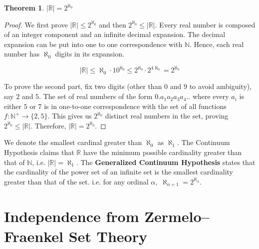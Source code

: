 \documentclass[12pt]{article}
\theoremstyle{definition}
\newtheorem{theorem}{Theorem}[section]
\begin{document}
\begin{theorem}
    $|\mathbb{R}| = 2^{\aleph_0}$
\end{theorem}
\begin{proof}
    We first prove $|\mathbb{R}|\leq2^{\aleph_0}$ and then $2^{\aleph_0}\leq|\mathbb{R}|$. Every real number is composed of an integer component and an infinite decimal expansion. The decimal expansion can be put into one to one correspondence with $\mathbb{N}$. Hence, each real number has  $\aleph_0$ digits in its expansion.
    
    $$|\mathbb{R}|\leq \aleph_0\cdot10^{\aleph_0}\leq2^{\aleph_0} \cdot 2^{4\aleph_0}=2^{\aleph_0}$$
    
    To prove the second part, fix two digits (other than $0$ and $9$ to avoid ambiguity), say $2$ and $5$. The set of real numbers of the form $0.a_1a_2a_3a_4..$ where every $a_i$ is either $5$ or $7$ is in one-to-one correspondence with the set of all functions $f:\mathbb{N}^+\to \{2,5\}$. This gives us $2^{\aleph_0}$ distinct real numbers in the set, proving $2^{\aleph_0}\leq|\mathbb{R}|$. Therefore, $|\mathbb{R}| = 2^{\aleph_0}$.
\end{proof}

We denote the smallest cardinal greater than $\aleph_0$ as $\aleph_1$. The Continuum Hypothesis claims that $\mathbb{R}$ have the minimum possible cardinality greater than that of $\mathbb{N}$, i.e. $|\mathbb{R}|=\aleph_1$. The \textbf{Generalized Continuum Hypothesis} states that the cardinality of the power set of an infinite set is the smallest cardinality greater than that of the set. i.e. for any ordinal $\alpha,$ $\aleph_{\alpha+1} = 2^{\aleph_\alpha}$.


\section{Independence from Zermelo–Fraenkel Set Theory}
\end{document}
